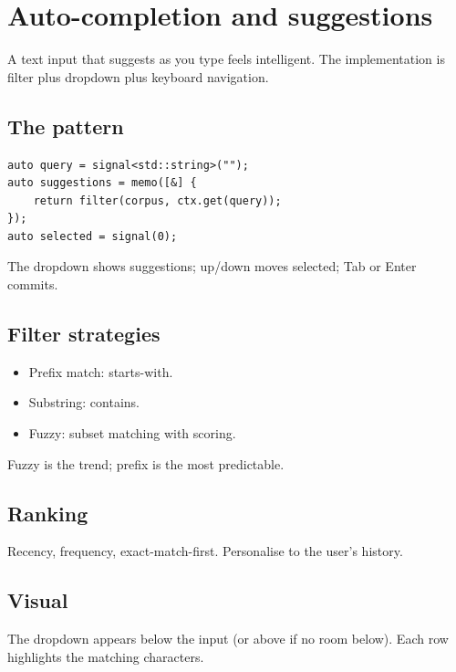 \chapter{Auto-completion and suggestions}
\label{ch:autocomplete}

\begin{aside}
A text input that suggests as you type feels intelligent. The
implementation is filter plus dropdown plus keyboard
navigation.
\end{aside}

\section{The pattern}

\begin{lstlisting}
auto query = signal<std::string>("");
auto suggestions = memo([&] {
    return filter(corpus, ctx.get(query));
});
auto selected = signal(0);
\end{lstlisting}

The dropdown shows suggestions; up/down moves selected;
Tab or Enter commits.

\section{Filter strategies}

\begin{itemize}[leftmargin=*]
  \item Prefix match: starts-with.
  \item Substring: contains.
  \item Fuzzy: subset matching with scoring.
\end{itemize}

Fuzzy is the trend; prefix is the most predictable.

\section{Ranking}

Recency, frequency, exact-match-first. Personalise to the
user's history.

\section{Visual}

The dropdown appears below the input (or above if no room
below). Each row highlights the matching characters.

